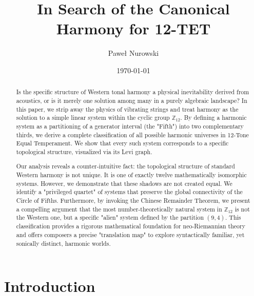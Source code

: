 \documentclass[12pt,letterpaper]{amsart}
\begin{document}
\title[The Harmonic Multiverse of 12TET]{In Search of the Canonical Harmony for 12-TET}

\author{Paweł Nurowski}
\address{Centrum Fizyki Teoretycznej,
Polska Akademia Nauk, Al.
Lotnik\'ow 32/46, 02-668 Warszawa, Poland, and
Guangdong Technion -- Israel Institute of Technology, No. 241, Daxue Road,
Jinping District, Shantou, Guangdong Province, China}

\date{\today}


\begin{abstract}
Is the specific structure of Western tonal harmony a physical inevitability derived from acoustics, or is it merely one solution among many in a purely algebraic landscape? In this paper, we strip away the physics of vibrating strings and treat harmony as the solution to a simple linear system within the cyclic group $\mathbb{Z}_{12}$. By defining a harmonic system as a partitioning of a generator interval (the "Fifth") into two complementary thirds, we derive a complete classification of all possible harmonic universes in 12-Tone Equal Temperament. We show that every such system corresponds to a specific topological structure, visualized via its Levi graph.

Our analysis reveals a counter-intuitive fact: the topological structure of standard Western harmony is not unique. It is one of exactly twelve mathematically isomorphic systems. However, we demonstrate that these shadows are not created equal. We identify a "privileged quartet" of systems that preserve the global connectivity of the Circle of Fifths. Furthermore, by invoking the Chinese Remainder Theorem, we present a compelling argument that the most number-theoretically natural system in $\mathbb{Z}_{12}$ is not the Western one, but a specific "alien" system defined by the partition $(9,4)$. This classification provides a rigorous mathematical foundation for neo-Riemannian theory and offers composers a precise "translation map" to explore syntactically familiar, yet sonically distinct, harmonic worlds.
\end{abstract}
\maketitle

\section{Introduction}
\end{document}
